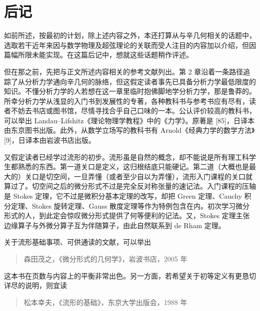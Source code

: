 \chapter*{后记}

如前所述，按最初的计划，除上述内容之外，本还打算从与辛几何相关的话题中，选取若干近年来因与数学物理及超弦理论的关联而受人注目的内容加以介绍，但因篇幅所限未能实现。在这篇后记中，想就这些话题稍作评述。

但在那之前，先把与正文所述内容相关的参考文献列出。第 2 章沿着一条路径追踪了从分析力学通向辛几何的脉络，但这假定读者事先已具备分析力学最低限度的知识。不懂分析力学的人若想在这一章里临时抱佛脚地学分析力学，那是鲁莽的。所幸分析力学从浅显的入门书到发展性的专著，各种教科书与参考书应有尽有，读者不妨去书店或图书馆，尽情寻找合乎自己口味的一本。公认评价较高的教科书，可以举出 Landau–Lifshitz《理论物理学教程》中的《力学》。原著是 [85]，日译本由东京图书出版。此外，从数学立场写的教科书有 Arnold《经典力学的数学方法》[9]，日译本由岩波书店出版。

又假定读者已经学过流形的初步。流形虽是自然的概念，却不能说是所有理工科学生都熟悉的东西。第一道关口是定义，这归根结底只能硬记。第二道（大概也是最大的）关口是切空间，一旦弄懂（或者至少自以为弄懂），流形入门课程的关口就算过了。切空间之后的微分形式不过是完全反对称张量的速记法。入门课程的压轴是 Stokes 定理，它不过是微积分基本定理的改写，却把 Green 定理、Cauchy 积分定理、Stokes 旋转定理、Gauss 散度定理等作为特例包含在内。初次学习微分形式的人，到此定会惊叹微分形式提供了何等便利的记法。又，Stokes 定理主张边缘算子与外微分算子互为伴随算子，由此自然联系到 de Rham 定理。

关于流形基础事项、可供通读的文献，可以举出
\begin{quote}
\noindent [森田 05] 森田茂之，《微分形式的几何学》，岩波书店，2005 年
\end{quote}
这本书在页数与内容上的平衡非常出色。另一方面，若希望关于初等定义有更恳切详尽的说明，则宜读
\begin{quote}
\noindent [松本 88] 松本幸夫，《流形的基础》，东京大学出版会，1988 年
\end{quote}

